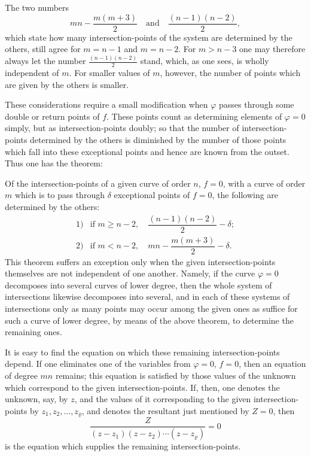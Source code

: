 \documentclass[10pt]{article}
\begin{document}
The two numbers
\[
mn-\frac{m(m+3)}{2}
\quad\text{and}\quad
\frac{(n-1)(n-2)}{2},
\]
which state how many intersection-points of the system are determined by the others, still agree for $m=n-1$ and $m=n-2$. For $m>n-3$ one may therefore always let the number $\frac{(n-1)(n-2)}{2}$ stand, which, as one sees, is wholly independent of $m$. For smaller values of $m$, however, the number of points which are given by the others is smaller.

These considerations require a small modification when $\varphi$ passes through some double or return points of $f$. These points count as determining elements of $\varphi=0$ simply, but as intersection-points doubly; so that the number of intersection-points determined by the others is diminished by the number of those points which fall into these exceptional points and hence are known from the outset. Thus one has the theorem:

Of the intersection-points of a given curve of order $n$, $f=0$, with a curve of order $m$ which is to pass through $\delta$ exceptional points of $f=0$, the following are determined by the others:
\[
\begin{array}{ll}
1) & \text{if }m\geq n-2,\quad \dfrac{(n-1)(n-2)}{2}-\delta;\\[0.4em]
2) & \text{if }m<n-2,\quad mn-\dfrac{m(m+3)}{2}-\delta.
\end{array}
\]
This theorem suffers an exception only when the given intersection-points themselves are not independent of one another. Namely, if the curve $\varphi=0$ decomposes into several curves of lower degree, then the whole system of intersections likewise decomposes into several, and in each of these systems of intersections only as many points may occur among the given ones as suffice for such a curve of lower degree, by means of the above theorem, to determine the remaining ones.

It is easy to find the equation on which these remaining intersection-points depend. If one eliminates one of the variables from $\varphi=0$, $f=0$, then an equation of degree $mn$ remains; this equation is satisfied by those values of the unknown which correspond to the given intersection-points. If, then, one denotes the unknown, say, by $z$, and the values of it corresponding to the given intersection-points by $z_1,z_2,\ldots,z_{\varrho}$, and denotes the resultant just mentioned by $Z=0$, then
\[
\frac{Z}{(z-z_1)(z-z_2)\cdots(z-z_{\varrho})}=0
\]
is the equation which supplies the remaining intersection-points.
\end{document}
